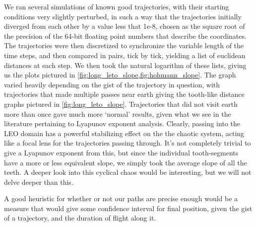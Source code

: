 We ran several simulations of known good trajectories, with their starting conditions very slightly perturbed, in such a way that the trajectories initially diverged from each other by a value less that 1e-8, chosen as the square root of the precision of the 64-bit floating point numbers that describe the coordinates. The trajectories were then discretized to synchronize the variable length of the time steps, and then compared in pairs, tick by tick, yielding a list of euclidean distances at each step. We then took the natural logarithm of these lists, giving us the plots pictured in \cref{fig:long_leto_slope,fig:hohmann_slope}. The graph varied heavily depending on the gist of the trajectory in question, with trajectories that made multiple passes near earth giving the tooth-like distance graphs pictured in \cref{fig:long_leto_slope}. Trajectories that did not visit earth more than once gave much more `normal' results, given what we see in the literature pertaining to Lyapunov exponent analysis. Clearly, passing into the LEO domain has a powerful stabilizing effect on the the chaotic system, acting like a focal lens for the trajectories passing through. It's not completely trivial to give a Lyapunov exponent from this, but since the individual tooth-segments have a more or less equivalent slope, we simply took the average slope of all the teeth. A deeper look into this cyclical chaos would be interesting, but we will not delve deeper than this.

A good heuristic for whether or not our paths are precise enough would be a measure that would give some confidence interval for final position, given the gist of a trajectory, and the duration of flight along it.

